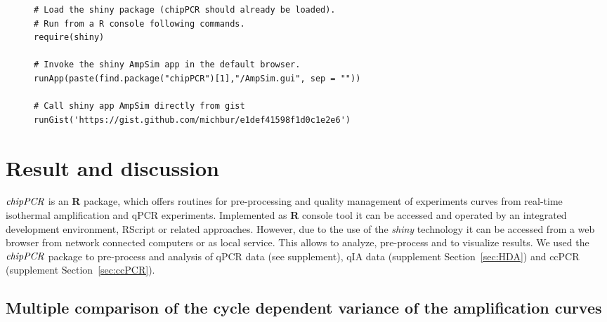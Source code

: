 \documentclass[twocolumn]{bmcart}%
\begin{document}
\begin{figure*}
\begin{verbatim}
# Load the shiny package (chipPCR should already be loaded).
# Run from a R console following commands.
require(shiny)

# Invoke the shiny AmpSim app in the default browser.
runApp(paste(find.package("chipPCR")[1],"/AmpSim.gui", sep = ""))

# Call shiny app AmpSim directly from gist
runGist('https://gist.github.com/michbur/e1def41598f1d0c1e2e6')
\end{verbatim}
\end{figure*}

\section*{Result and discussion}

$\emph{chipPCR}$ is an \textbf{R} package, which offers routines for 
pre-processing and quality management of experiments curves from real-time 
isothermal amplification and qPCR experiments. Implemented as \textbf{R} 
console tool it can be accessed and operated by an integrated development 
environment, RScript or related approaches. However, due to the use of the 
\emph{shiny} technology it can be accessed from a web browser from network 
connected computers or as local service. This allows to analyze, pre-process 
and to visualize results. We used the $\emph{chipPCR}$ package to 
pre-process and analysis of qPCR data (see supplement), qIA 
data (supplement Section~\ref{sec:HDA}) and ccPCR (supplement 
Section~\ref{sec:ccPCR}).

\subsection*{Multiple comparison of the cycle dependent variance of the 
amplification curves}
\end{document}
